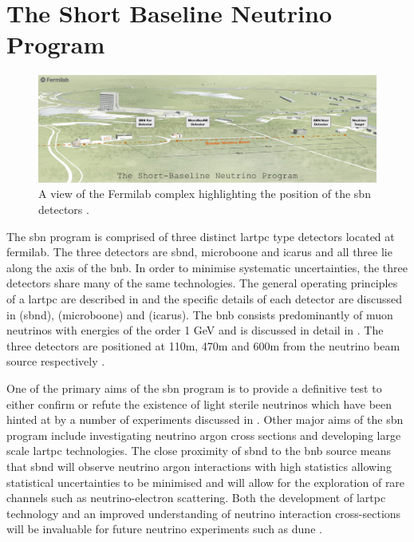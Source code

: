 \chapter{The Short Baseline Neutrino Program}
\label{chap:SBN Program}


\begin{figure}
    \centering
    \includegraphics[width = \largefigwidth]{figures-chap3/SBN_program.jpg}
    \caption[SBN map.]{A view of the Fermilab complex highlighting the position of the \gls{sbn} detectors \cite{SBN_paper}.}
    \label{fig:sbn_complex}
\end{figure}

The \gls{sbn} program is comprised of three distinct \gls{lartpc} type detectors located at \gls{fermilab}. The three detectors are \gls{sbnd}, \gls{microboone} and \gls{icarus} and all three lie along the axis of the \gls{bnb}. In order to minimise systematic uncertainties, the three detectors share many of the same technologies. The general operating principles of a \gls{lartpc} are described in  and the specific details of each detector are discussed in  (\gls{sbnd}),  (\gls{microboone}) and  (\gls{icarus}). The \gls{bnb} consists predominantly of muon neutrinos with energies of the order 1 GeV and is discussed in detail in . The three detectors are positioned at 110m, 470m and 600m from the neutrino beam source respectively \cite{SBN_paper}. 

One of the primary aims of the \gls{sbn} program is to provide a definitive test to either confirm or refute the existence of light sterile neutrinos which have been hinted at by a number of experiments discussed in . Other major aims of the \gls{sbn} program include investigating neutrino argon cross sections and developing large scale \gls{lartpc} technologies. The close proximity of \gls{sbnd} to the \gls{bnb} source means that \gls{sbnd} will observe neutrino argon interactions with high statistics allowing statistical uncertainties to be minimised and will allow for the exploration of rare channels such as neutrino-electron scattering. Both the development of \gls{lartpc} technology and an improved understanding of neutrino interaction cross-sections will be invaluable for future neutrino experiments such as \gls{dune} \cite{SBN_paper}.



